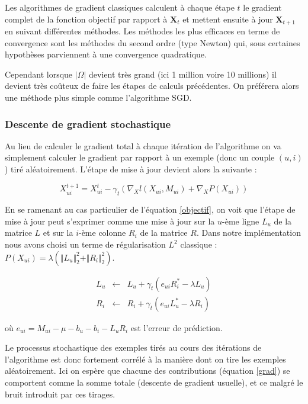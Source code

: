\documentclass[10pt,a4paper]{article}
\begin{document}
Les algorithmes de gradient classiques calculent à chaque étape $t$ le gradient complet de la fonction objectif par rapport à $\textbf{X}_t$ et mettent ensuite à jour $\textbf{X}_{t+1}$ en suivant différentes méthodes. Les méthodes les plus efficaces en terme de convergence sont les méthodes du second ordre (type Newton) qui, sous certaines hypothèses parviennent à une convergence quadratique. 

Cependant lorsque $| \Omega |$ devient très grand (ici 1 million voire 10 millions) il devient très coûteux de faire les étapes de calculs précédentes. On préférera alors une méthode plus simple comme l'algorithme SGD.

\subsubsection*{Descente de gradient stochastique}

Au lieu de calculer le gradient total à chaque itération de l'algorithme on va simplement calculer le gradient par rapport à un exemple (donc un couple $(u,i)$)  tiré aléatoirement. L'étape de mise à jour devient alors la suivante :

\begin{equation}
\label{grad}
X_{ui}^{t+1} = X_{ui}^t-\gamma_t\left(\nabla_Xl(X_{ui},M_{ui})+\nabla_XP(X_{ui})\right)
\end{equation}


En se ramenant au cas particulier de l'équation \eqref{objectif}, on voit que l'étape de mise à jour peut s'exprimer comme une mise à jour sur la $u$-ème ligne $L_u$ de la matrice $L$ et sur la $i$-ème colonne $R_i$ de la matrice $R$. Dans notre implémentation nous avons choisi un terme de régularisation $L^2$ classique \cite{koren}: $P(X_{ui}) = \lambda\left(\Vert L_u \Vert_2^2 + \Vert R_i \Vert_2^2\right)$.


\begin{eqnarray}
\label{grad1}
L_u & \leftarrow & L_u + \gamma_t\left(e_{ui}R_i^*-\lambda L_u  \right) \\
R_i & \leftarrow & R_i  + \gamma_t\left(e_{ui}L_u^*-\lambda R_i  \right)
\label{grad2}
\end{eqnarray}

où $e_{ui} = M_{ui} -  \mu - b_u  - b_i-L_{u}R_{i} $ est l'erreur de prédiction.

Le processus stochastique des exemples tirés au cours des itérations de l'algorithme est donc fortement corrélé à la manière dont on tire les exemples aléatoirement. Ici on espère que chacune des contributions (équation \eqref{grad}) se comportent comme la somme totale (descente de gradient usuelle), et ce malgré le bruit introduit par ces tirages.
\end{document}
